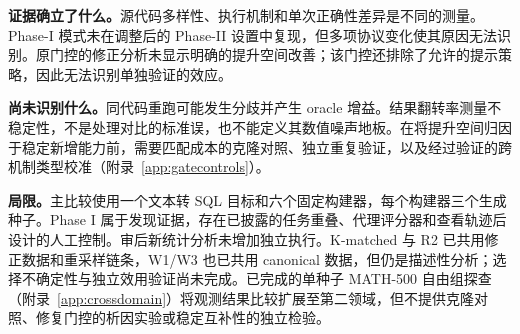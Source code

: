 \textbf{证据确立了什么。}源代码多样性、执行机制和单次正确性差异是不同的测量。Phase-I 模式未在调整后的 Phase-II 设置中复现，但多项协议变化使其原因无法识别。原门控的修正分析未显示明确的提升空间改善；该门控还排除了允许的提示策略，因此无法识别单独验证的效应。

\textbf{尚未识别什么。}同代码重跑可能发生分歧并产生 oracle 增益。结果翻转率测量不稳定性，不是处理对比的标准误，也不能定义其数值噪声地板。在将提升空间归因于稳定新增能力前，需要匹配成本的克隆对照、独立重复验证，以及经过验证的跨机制类型校准（附录~\ref{app:gatecontrols}）。

\textbf{局限。}主比较使用一个文本转 SQL 目标和六个固定构建器，每个构建器三个生成种子。Phase I 属于发现证据，存在已披露的任务重叠、代理评分器和查看轨迹后设计的人工控制。审后新统计分析未增加独立执行。K-matched 与 R2 已共用修正数据和重采样链条，W1/W3 也已共用 canonical 数据，但仍是描述性分析；选择不确定性与独立效用验证尚未完成。已完成的单种子 MATH-500 自由组探查（附录~\ref{app:crossdomain}）将观测结果比较扩展至第二领域，但不提供克隆对照、修复门控的析因实验或稳定互补性的独立检验。
